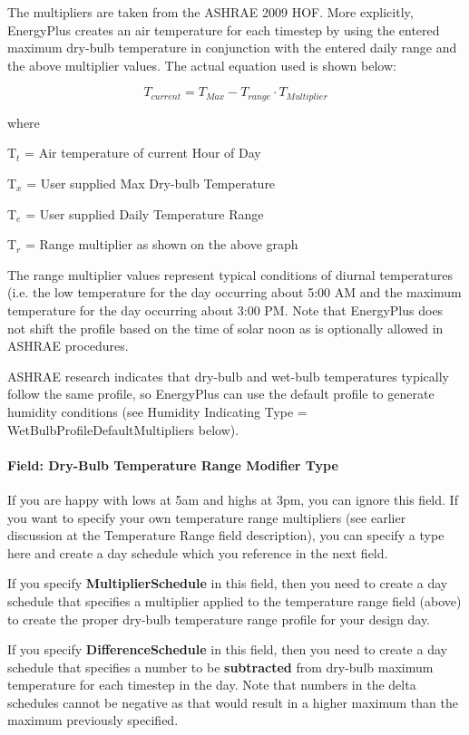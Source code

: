The multipliers are taken from the ASHRAE 2009 HOF. More explicitly, EnergyPlus creates an air temperature for each timestep by using the entered maximum dry-bulb temperature in conjunction with the entered daily range and the above multiplier values. The actual equation used is shown below:

\begin{equation}
{T_{current}} = {T_{Max}} - {T_{range}}\cdot {T_{Multiplier}}
\end{equation}

where

T\(_{t}\) = Air temperature of current Hour of Day

T\(_{x}\) = User supplied Max Dry-bulb Temperature

T\(_{e}\) = User supplied Daily Temperature Range

T\(_{r}\) = Range multiplier as shown on the above graph

The range multiplier values represent typical conditions of diurnal temperatures (i.e. the low temperature for the day occurring about 5:00 AM and the maximum temperature for the day occurring about 3:00 PM. Note that EnergyPlus does not shift the profile based on the time of solar noon as is optionally allowed in ASHRAE procedures.

ASHRAE research indicates that dry-bulb and wet-bulb temperatures typically follow the same profile, so EnergyPlus can use the default profile to generate humidity conditions (see Humidity Indicating Type = WetBulbProfileDefaultMultipliers below).

\paragraph{Field: Dry-Bulb Temperature Range Modifier Type}\label{field-dry-bulb-temperature-range-modifier-type}

If you are happy with lows at 5am and highs at 3pm, you can ignore this field. If you want to specify your own temperature range multipliers (see earlier discussion at the Temperature Range field description), you can specify a type here and create a day schedule which you reference in the next field.

If you specify \textbf{MultiplierSchedule} in this field, then you need to create a day schedule that specifies a multiplier applied to the temperature range field (above) to create the proper dry-bulb temperature range profile for your design day.

If you specify \textbf{DifferenceSchedule} in this field, then you need to create a day schedule that specifies a number to be \textbf{subtracted} from dry-bulb maximum temperature for each timestep in the day. Note that numbers in the delta schedules cannot be negative as that would result in a higher maximum than the maximum previously specified.

